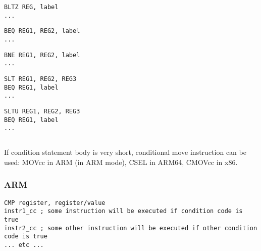 \begin{lstlisting}[caption=\RU{Меньше ли нуля?}\EN{Check for less than zero:}]
BLTZ REG, label
...
\end{lstlisting}

\begin{lstlisting}[caption=\RU{Проверка на равенство}\EN{Check for equal values}]
BEQ REG1, REG2, label
...
\end{lstlisting}

\begin{lstlisting}[caption=\RU{Проверка на неравенство}\EN{Check for non-equal values}]
BNE REG1, REG2, label
...
\end{lstlisting}

\begin{lstlisting}[caption=\RU{Проверка на меньше, больше (знаковое)}\EN{Check for less than, greater than (signed)}]
SLT REG1, REG2, REG3
BEQ REG1, label
...
\end{lstlisting}

\begin{lstlisting}[caption=\RU{Проверка на меньше, больше (беззнаковое)}\EN{Check for less than, greater than (unsigned)}]
SLTU REG1, REG2, REG3
BEQ REG1, label
...
\end{lstlisting}
\fi

\subsection{}

If condition statement body is very short, conditional move instruction can be used: 
MOVcc in ARM (in ARM mode), CSEL in ARM64, CMOVcc in x86.

\ifdefined\IncludeARM
\subsubsection{ARM}


\begin{lstlisting}[caption=ARM (\ARMMode)]
CMP register, register/value
instr1_cc ; some instruction will be executed if condition code is true
instr2_cc ; some other instruction will be executed if other condition code is true
... etc ...
\end{lstlisting}


